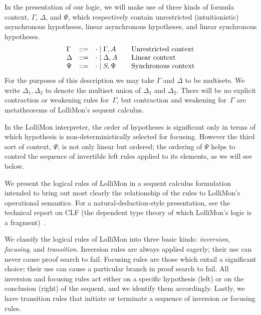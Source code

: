 \documentclass{sig-alt}
\begin{document}
In the presentation of our logic, we will make use of three kinds of
formula context, $\Gamma$, $\Delta$, and $\Psi$, which respectively contain unrestricted
(intuitionistic) asynchronous hypotheses, linear asynchronous
hypotheses, and linear synchronous hypotheses.
$$
\begin{array}{lll@{\qquad}l}
  \Gamma & ::= & \cdot \mid \Gamma, A & \mbox{Unrestricted context}\\
  \Delta & ::= & \cdot \mid \Delta, A & \mbox{Linear context}\\
  \Psi   & ::= & \cdot \mid S, \Psi & \mbox{Synchronous context}\\
\end{array}
$$
For the purposes of this description we may take $\Gamma$ and
$\Delta$ to be multisets. We write $\Delta_1,\Delta_2$ to
denote the multiset union of $\Delta_1$ and $\Delta_2$.
There will be no explicit contraction or weakening rules for~$\Gamma$,
but contraction and weakening for~$\Gamma$ are metatheorems of LolliMon's
sequent calculus.

In the
LolliMon interpreter, the order of hypotheses is significant only in
terms of which hypothesis is non-deterministically selected for
focusing.  However the third sort of context, $\Psi$, is not only linear but
ordered; the ordering of $\Psi$ helps to control the sequence of
invertible left rules applied to its elements, as we will see below.

\def\CLFRIseq#1#2#3{#1;#2\Rightarrow#3}
\def\CLFLFseq#1#2#3#4{#1;#2;#3\mathrel{>\!\! >}#4}
\def\CLFLseq#1#2#3{#1;#2\rightarrow#3}
\def\CLFLLFseq#1#2#3#4{#1;#2;#3\mathrel>#4}
\def\CLFLIseq#1#2#3#4{#1;#2;#3\rightarrow#4}
\def\CLFRFseq#1#2#3{#1;#2\mathrel{>\!\! >}#3}

We present the logical rules of LolliMon in a sequent calculus
formulation intended to bring out most clearly the relationship of the
rules to LolliMon's operational semantics.  For a
natural-deduction-style presentation, see the technical report on
CLF (the dependent type theory of which LolliMon's
logic is a fragment)~\cite{Watkins02tr}.  

We classify the logical rules of LolliMon into three basic kinds: {\it
inversion}, {\it focusing}, and {\it transition}.  Inversion rules are
always applied eagerly; their use can never cause proof search to fail.
Focusing rules are those which entail a significant choice; their use
can cause a particular branch in proof search to fail.  All inversion
and focusing rules act either on a specific hypothesis (left) or on the
conclusion (right) of the sequent, and we identify them accordingly.
Lastly, we have transition rules that initiate or terminate a sequence
of inversion or focusing rules.
\end{document}
